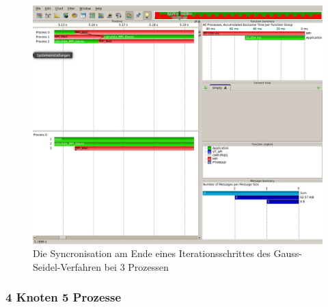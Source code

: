 \documentclass[a4paper,12pt]{scrartcl}
\begin{document}
\begin{figure}[hr!]
 \includegraphics[scale=0.45]{./3_2_GS/Syncronize.png}
 \caption{Die Syncronisation am Ende eines Iterationsschrittes des Gauss-Seidel-Verfahren bei 3 Prozessen}
\end{figure}

\subsubsection{4 Knoten 5 Prozesse}
\end{document}
